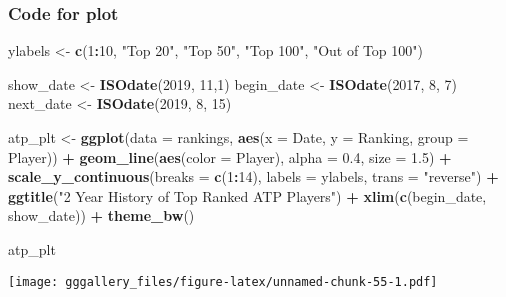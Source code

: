 \documentclass[]{book}
\newenvironment{Shaded}{\begin{snugshade}}{\end{snugshade}}
\newcommand{\DataTypeTok}[1]{\textcolor[rgb]{0.13,0.29,0.53}{#1}}
\newcommand{\DecValTok}[1]{\textcolor[rgb]{0.00,0.00,0.81}{#1}}
\newcommand{\FloatTok}[1]{\textcolor[rgb]{0.00,0.00,0.81}{#1}}
\newcommand{\KeywordTok}[1]{\textcolor[rgb]{0.13,0.29,0.53}{\textbf{#1}}}
\newcommand{\NormalTok}[1]{#1}
\newcommand{\OperatorTok}[1]{\textcolor[rgb]{0.81,0.36,0.00}{\textbf{#1}}}
\newcommand{\StringTok}[1]{\textcolor[rgb]{0.31,0.60,0.02}{#1}}
\begin{document}
\hypertarget{atpcode}{%
\subsubsection*{Code for plot}\label{atpcode}}

\begin{Shaded}
\begin{Highlighting}[]
\NormalTok{ylabels <-}\StringTok{ }\KeywordTok{c}\NormalTok{(}\DecValTok{1}\OperatorTok{:}\DecValTok{10}\NormalTok{, }\StringTok{"Top 20"}\NormalTok{, }\StringTok{"Top 50"}\NormalTok{, }\StringTok{"Top 100"}\NormalTok{, }\StringTok{"Out of Top 100"}\NormalTok{)}


\NormalTok{show_date <-}\StringTok{ }\KeywordTok{ISOdate}\NormalTok{(}\DecValTok{2019}\NormalTok{, }\DecValTok{11}\NormalTok{,}\DecValTok{1}\NormalTok{)}
\NormalTok{begin_date <-}\StringTok{ }\KeywordTok{ISOdate}\NormalTok{(}\DecValTok{2017}\NormalTok{, }\DecValTok{8}\NormalTok{, }\DecValTok{7}\NormalTok{)}
\NormalTok{next_date <-}\StringTok{ }\KeywordTok{ISOdate}\NormalTok{(}\DecValTok{2019}\NormalTok{, }\DecValTok{8}\NormalTok{, }\DecValTok{15}\NormalTok{)}


\NormalTok{atp_plt <-}\StringTok{ }\KeywordTok{ggplot}\NormalTok{(}\DataTypeTok{data =}\NormalTok{ rankings, }\KeywordTok{aes}\NormalTok{(}\DataTypeTok{x =}\NormalTok{ Date, }\DataTypeTok{y =}\NormalTok{ Ranking, }\DataTypeTok{group =}\NormalTok{ Player)) }\OperatorTok{+}\StringTok{ }
\StringTok{  }\KeywordTok{geom_line}\NormalTok{(}\KeywordTok{aes}\NormalTok{(}\DataTypeTok{color =}\NormalTok{ Player), }\DataTypeTok{alpha =} \FloatTok{0.4}\NormalTok{, }\DataTypeTok{size =} \FloatTok{1.5}\NormalTok{) }\OperatorTok{+}
\StringTok{  }\KeywordTok{scale_y_continuous}\NormalTok{(}\DataTypeTok{breaks =} \KeywordTok{c}\NormalTok{(}\DecValTok{1}\OperatorTok{:}\DecValTok{14}\NormalTok{), }\DataTypeTok{labels =}\NormalTok{ ylabels, }\DataTypeTok{trans =} \StringTok{"reverse"}\NormalTok{) }\OperatorTok{+}\StringTok{ }
\StringTok{  }\KeywordTok{ggtitle}\NormalTok{(}\StringTok{"2 Year History of Top Ranked ATP Players"}\NormalTok{) }\OperatorTok{+}\StringTok{ }
\StringTok{  }\KeywordTok{xlim}\NormalTok{(}\KeywordTok{c}\NormalTok{(begin_date, show_date)) }\OperatorTok{+}
\StringTok{  }\KeywordTok{theme_bw}\NormalTok{() }

\NormalTok{atp_plt}
\end{Highlighting}
\end{Shaded}

\texttt{[image: gggallery\_files/figure-latex/unnamed-chunk-55-1.pdf]}
\end{document}
